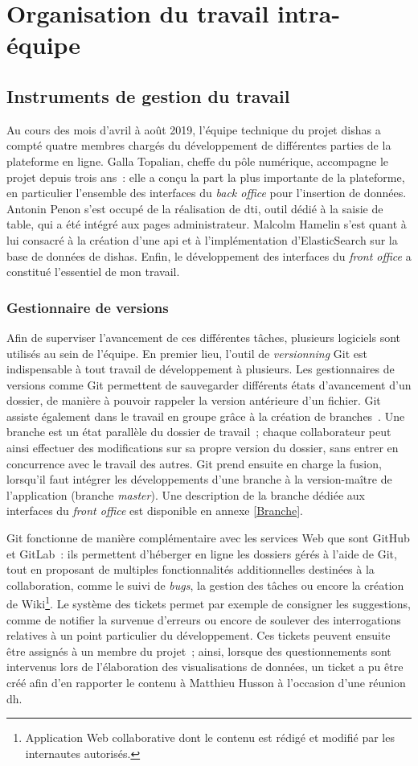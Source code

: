 \documentclass[a4paper,12pt,twoside]{book}
\newcommand{\eng}{\emph}
\newcommand{\bdd}{base de données\xspace}
\newcommand{\fo}{\eng{front office}\xspace}
\newcommand{\g}[1]{\og#1~\fg}
\newcommand{\dishas}{\gls{dishas}\xspace}
\newcommand{\dti}{\gls{dti}\xspace}
\newcommand{\api}{\gls{api}\xspace}
\newcommand{\dhu}{\gls{dh}\xspace}
\begin{document}
	\section{Organisation du travail intra-équipe}
		\subsection{Instruments de gestion du travail}
Au cours des mois d'avril à août 2019, l'équipe technique du projet \dishas a compté quatre membres chargés du développement de différentes parties de la plateforme en ligne. Galla Topalian, cheffe du pôle numérique, accompagne le projet depuis trois ans~: elle a conçu la part la plus importante de la plateforme, en particulier l'ensemble des interfaces du \eng{back office} pour l'insertion de données. Antonin Penon s'est occupé de la réalisation de \dti, outil dédié à la saisie de table, qui a été intégré aux pages administrateur. Malcolm Hamelin s'est quant à lui consacré à la création d'une \api et à l'implémentation d'ElasticSearch sur la \bdd de \dishas. Enfin, le développement des interfaces du \fo a constitué l'essentiel de mon travail.

			\subsubsection{Gestionnaire de versions}
Afin de superviser l'avancement de ces différentes tâches, plusieurs logiciels sont utilisés au sein de l'équipe. En premier lieu, l'outil de \eng{versionning} Git est indispensable à tout travail de développement à plusieurs. Les gestionnaires de versions comme Git permettent de sauvegarder différents états d'avancement d'un dossier, de manière à pouvoir rappeler la version antérieure d'un fichier. Git assiste également dans le travail en groupe grâce à la création de \g{branches}. Une branche est un état parallèle du dossier de travail~; chaque collaborateur peut ainsi effectuer des modifications sur sa propre version du dossier, sans entrer en concurrence avec le travail des autres. Git prend ensuite en charge la fusion, lorsqu'il faut intégrer les développements d'une branche à la version-maître de l'application (branche \eng{master}). Une description de la branche dédiée aux interfaces du \fo est disponible en annexe \ref{Branche}.

Git fonctionne de manière complémentaire avec les services Web que sont GitHub et GitLab~: ils permettent d'héberger en ligne les dossiers gérés à l'aide de Git, tout en proposant de multiples fonctionnalités additionnelles destinées à la collaboration, comme le suivi de \eng{bugs}, la gestion des tâches ou encore la création de Wiki\footnote{Application Web collaborative dont le contenu est rédigé et modifié par les internautes autorisés.}. Le système des tickets permet par exemple de consigner les suggestions, comme de notifier la survenue d'erreurs ou encore de soulever des interrogations relatives à un point particulier du développement. Ces tickets peuvent ensuite être assignés à un membre du projet~; ainsi, lorsque des questionnements sont intervenus lors de l'élaboration des visualisations de données, un ticket a pu être créé afin d'en rapporter le contenu à Matthieu Husson à l'occasion d'une réunion \dhu.
\end{document}
